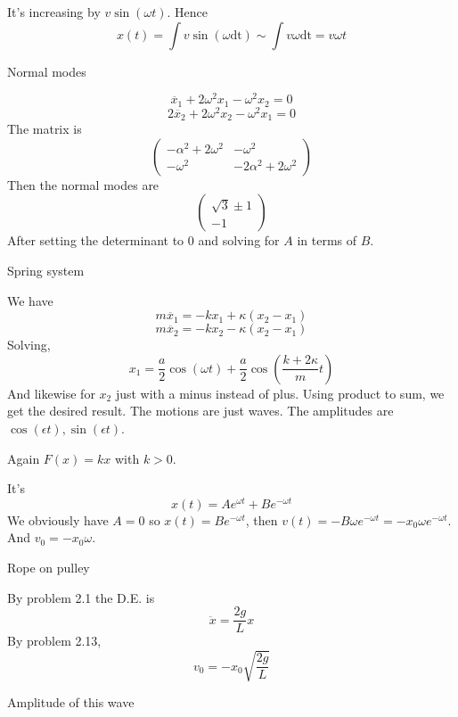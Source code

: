 \documentclass[11pt]{scrartcl}
\newcommand{\ca}[1]{\mathrm{#1}}
\begin{document}
\begin{soln}
  It's increasing by $v\sin(\omega t)$. Hence
  $$x(t)=\int v\sin(\omega \ca{dt})\sim \int v \omega \ca {dt}=v\omega t$$
\end{soln}
\begin{example}
  [4.9]
  Normal modes
\end{example}
\begin{soln}
  $$\ddot{x_1}+2\omega^2 x_1-\omega^2 x_2=0$$
  $$2\ddot{x_2}+2\omega^2 x_2-\omega^2 x_1=0$$
  The matrix is
  $$\begin{pmatrix}-\alpha^2+2\omega^2 & -\omega^2 \\ -\omega^2 & -2\alpha^2+2\omega^2\end{pmatrix}$$
  Then the normal modes are
  $$\begin{pmatrix}\sqrt{3}\pm 1 \\ -1\end{pmatrix}$$
  After setting the determinant to $0$ and solving for $A$ in terms of $B$.
\end{soln}
\begin{example}
  [4.10]
  Spring system
\end{example}
\begin{soln}
  We have
  $$m\ddot{x_1}=-kx_1+\kappa(x_2-x_1)$$
  $$m\ddot{x_2}=-kx_2-\kappa(x_2-x_1)$$
  Solving,
  $$x_1=\frac{a}{2}\cos(\omega t)+\frac{a}{2}\cos\left(\frac{k+2\kappa}{m}t\right)$$
  And likewise for $x_2$ just with a minus instead of plus. Using product to sum,
  we get the desired result. The motions are just waves. The amplitudes are $\cos(\epsilon t),\sin(\epsilon t)$.
\end{soln}
\begin{example}
  [4.13]
  Again $F(x)=kx$ with $k>0$.
\end{example}
\begin{soln}
  It's
  $$x(t)=Ae^{\omega t}+Be^{-\omega t}$$
  We obviously have $A=0$ so $x(t)=Be^{-\omega t}$, then
  $v(t)=-B\omega e^{-\omega t}=-x_0\omega e^{-\omega t}$. And $v_0=-x_0\omega$.
\end{soln}
\begin{example}
  [4.14]
  Rope on pulley
\end{example}
\begin{soln}
  By problem 2.1 the D.E. is
  $$\ddot{x}=\frac{2g}{L}x$$
  By problem 2.13,
  $$v_0=-x_0\sqrt{\frac{2g}{L}}$$
\end{soln}
\begin{example}
  [4.15]
  Amplitude of this wave
\end{example}
\end{document}
